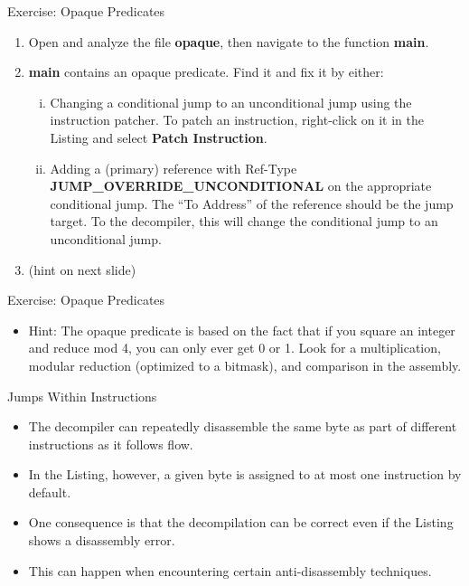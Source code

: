 \documentclass{beamer}
\begin{document}
\begin{frame}
\begin{block}{Exercise: Opaque Predicates}
\begin{enumerate}
\item Open and analyze the file \textbf{opaque}, then navigate to the function \textbf{main}.
\item \textbf{main} contains an opaque predicate.  Find it and fix it by either:
\begin{enumerate}[(i)]
\item Changing a conditional jump to an unconditional jump using the instruction patcher.  To patch an instruction, right-click on it in the Listing and select \textbf{Patch Instruction}.
\item Adding a (primary) reference with Ref-Type \textbf{JUMP\_OVERRIDE\_UNCONDITIONAL} on the appropriate conditional jump. The ``To Address'' of the reference should be the jump target. 
 To the decompiler, this will change the conditional jump to an unconditional jump.
\end{enumerate}
\item[] (hint on next slide)
\end{enumerate}
\end{block}
\end{frame}

\begin{frame}
\begin{block}{Exercise: Opaque Predicates}
\begin{itemize}
\item Hint: The opaque predicate is based on the fact that if you square an integer and reduce mod 4, you can only ever get 0 or 1.  Look for a multiplication, modular reduction (optimized to a bitmask), and comparison in the assembly.
\end{itemize}
\end{block}
\end{frame}

\begin{frame}
\begin{block}{Jumps Within Instructions}
\begin{itemize}
\item The decompiler can repeatedly disassemble the same byte as part of different instructions as it follows flow.
\item In the Listing, however, a given byte is assigned to at most one instruction by default.
\item One consequence is that the decompilation can be correct even if the Listing shows a disassembly error.
\item This can happen when encountering certain anti-disassembly techniques.
\end{itemize}
\end{block}
\end{frame}
\end{document}
